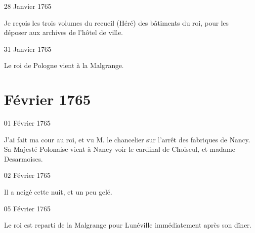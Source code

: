                      \begin{diary}{28 Janvier 1765}{}


                           Je reçois les trois volumes du recueil
                              (Héré) des bâtiments du roi, pour les
                           déposer aux archives de l'hôtel de
                              ville. \bigskip


                     \end{diary}

                     \begin{diary}{31 Janvier 1765}{}


                           Le roi de Pologne vient à
                              la Malgrange. \bigskip


                     \end{diary}
                  \chapter*{Février 1765}



                     \begin{diary}{01 Février 1765}{}

                         J'ai fait ma cour au roi, et vu M.
                              le chancelier sur l'arrêt des fabriques
                              de Nancy. Sa Majesté Polonaise vient à Nancy
                           voir le cardinal de Choiseul, et madame Desarmoises. \bigskip


                     \end{diary}
                     \begin{diary}{02 Février 1765}{}


                           Il a neigé cette nuit, et un peu gelé. \bigskip


                     \end{diary}

                     \begin{diary}{05 Février 1765}{}


                           Le roi est reparti de
                              la Malgrange pour Lunéville
                           immédiatement après son dîner. \bigskip


                     \end{diary}

